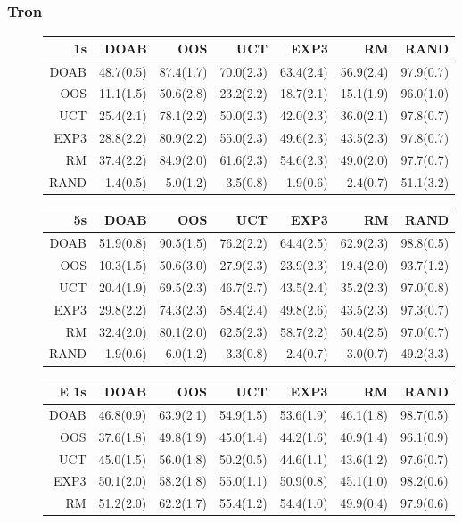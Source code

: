 \subsubsection{Tron}
\begin{figure}[t!]
\centering
\begin{scriptsize}
\begin{tabular}{|r|rrrrrr|}\hline
1s &DOAB&OOS&UCT&EXP3&RM&RAND\\\hline
DOAB&48.7(0.5)&87.4(1.7)&70.0(2.3)&63.4(2.4)&56.9(2.4)&97.9(0.7)\\
OOS&11.1(1.5)&50.6(2.8)&23.2(2.2)&18.7(2.1)&15.1(1.9)&96.0(1.0)\\
UCT&25.4(2.1)&78.1(2.2)&50.0(2.3)&42.0(2.3)&36.0(2.1)&97.8(0.7)\\
EXP3&28.8(2.2)&80.9(2.2)&55.0(2.3)&49.6(2.3)&43.5(2.3)&97.8(0.7)\\
RM&37.4(2.2)&84.9(2.0)&61.6(2.3)&54.6(2.3)&49.0(2.0)&97.7(0.7)\\
RAND&1.4(0.5)&5.0(1.2)&3.5(0.8)&1.9(0.6)&2.4(0.7)&51.1(3.2)\\
\hline
\end{tabular}
\begin{tabular}{|r|rrrrrr|}\hline
5s&DOAB&OOS&UCT&EXP3&RM&RAND\\\hline
DOAB&51.9(0.8)&90.5(1.5)&76.2(2.2)&64.4(2.5)&62.9(2.3)&98.8(0.5)\\
OOS&10.3(1.5)&50.6(3.0)&27.9(2.3)&23.9(2.3)&19.4(2.0)&93.7(1.2)\\
UCT&20.4(1.9)&69.5(2.3)&46.7(2.7)&43.5(2.4)&35.2(2.3)&97.0(0.8)\\
EXP3&29.8(2.2)&74.3(2.3)&58.4(2.4)&49.8(2.6)&43.5(2.3)&97.3(0.7)\\
RM&32.4(2.0)&80.1(2.0)&62.5(2.3)&58.7(2.2)&50.4(2.5)&97.0(0.7)\\
RAND&1.9(0.6)&6.0(1.2)&3.3(0.8)&2.4(0.7)&3.0(0.7)&49.2(3.3)\\
\hline
\end{tabular}
\begin{tabular}{|r|rrrrrr|}\hline
E 1s&DOAB&OOS&UCT&EXP3&RM&RAND\\\hline
DOAB&46.8(0.9)&63.9(2.1)&54.9(1.5)&53.6(1.9)&46.1(1.8)&98.7(0.5)\\
OOS&37.6(1.8)&49.8(1.9)&45.0(1.4)&44.2(1.6)&40.9(1.4)&96.1(0.9)\\
UCT&45.0(1.5)&56.0(1.8)&50.2(0.5)&44.6(1.1)&43.6(1.2)&97.6(0.7)\\
EXP3&50.1(2.0)&58.2(1.8)&55.0(1.1)&50.9(0.8)&45.1(1.0)&98.2(0.6)\\
RM&51.2(2.0)&62.2(1.7)&55.4(1.2)&54.4(1.0)&49.9(0.4)&97.9(0.6)\\

\end{tabular}
\end{scriptsize}
\end{figure}
